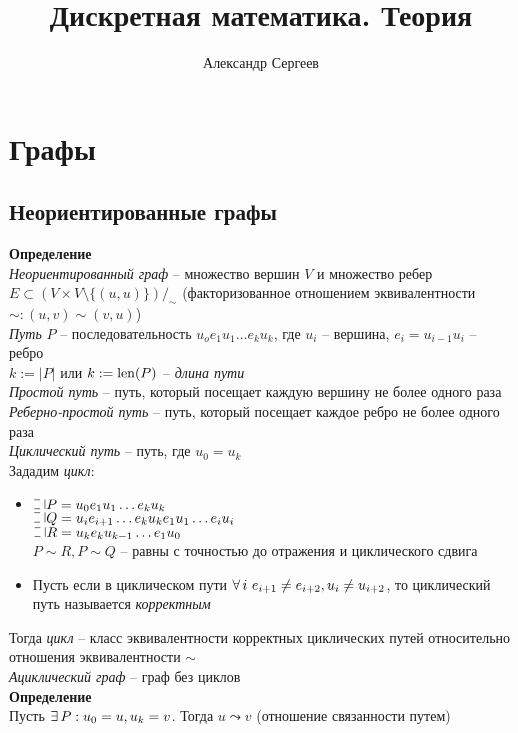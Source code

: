 \documentclass[12pt]{article}
\title{Дискретная математика. Теория}
\author{Александр Сергеев}
\date{}
\begin{document}
\maketitle
\section{Графы}
\subsection{Неориентированные графы}
\textbf{Определение}\\
\textit{Неориентированный граф} -- множество вершин $V$ и множество ребер $E \subset (V\times V \setminus \{(u,u)\})/_\sim$ (факторизованное отношением эквивалентности $\sim: (u, v) \sim (v, u)$)\\
\textit{Путь} $P$ -- последовательность $u_oe_1u_1\ldots e_ku_k$, где $u_i$ -- вершина, $e_i = u_{i-1}u_i$ -- ребро\\
$k:=|P|$ или $k:=\operatorname{len}(P)$ -- \textit{длина пути}\\
\textit{Простой путь} -- путь, который посещает каждую вершину не более одного раза\\
\textit{Реберно-простой путь} -- путь, который посещает каждое ребро не более одного раза\\
\textit{Циклический путь} -- путь, где $u_0 = u_k$\\
Зададим \textit{цикл}:
\begin{itemize}
    \item $\letus P = u_0 e_1u_1\ldots e_ku_k$\\
    $\letus Q = u_ie_{i+1}\ldots e_ku_ke_1u_1\ldots e_iu_i$\\
    $\letus R = u_k e_ku_{k-1}\ldots e_1u_0$\\
    $P \sim R, P \sim Q$ -- равны с точностью до отражения и циклического сдвига
    \item Пусть если в циклическом пути $\fall i\ e_{i+1} \neq e_{i+2}, u_i \neq u_{i+2}$, то циклический путь называется \textit{корректным}
\end{itemize}
Тогда \textit{цикл} -- класс эквивалентности корректных циклических путей относительно отношения эквивалентности $\sim$\\
\textit{Ациклический граф} -- граф без циклов\\
\textbf{Определение}\\
Пусть $\exists\, P: u_0 = u, u_k = v$. Тогда $u\leadsto v$ (отношение связанности путем)\\
\end{document}
